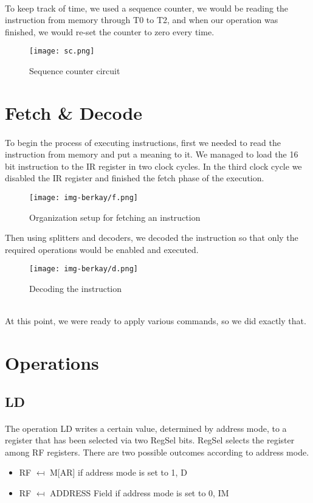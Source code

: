 \documentclass{article}
\begin{document}
\paragraph{}
To keep track of time, we used a sequence counter, we would be reading the instruction from memory through T0 to T2, and when our operation was finished, we would re-set the counter to zero every time.
\begin{figure}[h]
    \centering
    \texttt{[image: sc.png]}
    \caption{Sequence counter circuit}
    \label{fig:my_label}
\end{figure}
\section{Fetch \& Decode}
\paragraph{}
To begin the process of executing instructions, first we needed to read the instruction from memory and put a meaning to it. We managed to load the 16 bit instruction to the IR register in two clock cycles. In the third clock cycle we disabled the IR register and finished the fetch phase of the execution.
\begin{figure}[h]
    \centering
    \texttt{[image: img-berkay/f.png]}
    \caption{Organization setup for fetching an instruction}
    \label{fig:my_label}
\end{figure}
\newpage
Then using splitters and decoders, we decoded the instruction so that only the required operations would be enabled and executed.
\begin{figure}[h]
    \centering
    \texttt{[image: img-berkay/d.png]}
    \caption{Decoding the instruction}
    \label{fig:my_label}
\end{figure}
\\At this point, we were ready to apply various commands, so we did exactly that.
\newpage
\section{Operations}
\subsection{LD}
\paragraph{}
The operation LD writes a certain value, determined by address mode, to a register that has been selected via two RegSel bits. RegSel selects the register among RF registers. There are two possible outcomes according to address mode.
\begin{itemize}
    \item RF $\mapsfrom$ M[AR] if address mode is set to 1, D
    \item RF $\mapsfrom$ ADDRESS Field if address mode is set to 0, IM
\end{itemize}
\end{document}
